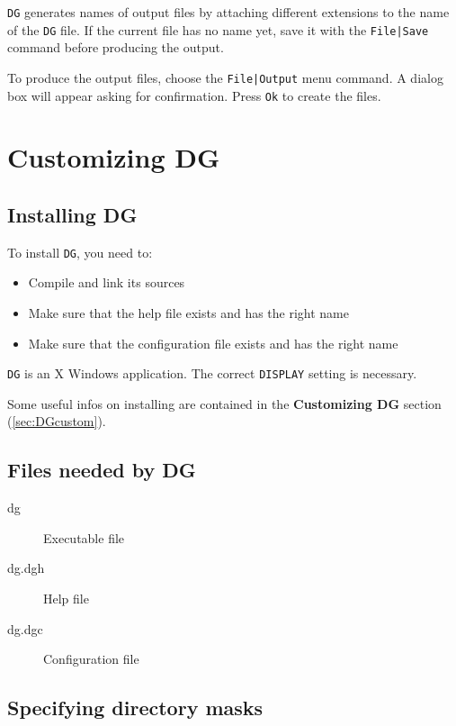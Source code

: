 \documentclass[a4paper,10pt]{report}
\begin{document}
{\tt DG} generates names of output files by attaching different extensions
to the name of the {\tt DG} file. If the current file has no name yet, save
it with the {\tt File|Save} command before producing the output.

To produce the output files, choose the {\tt File|Output} menu
command. A dialog box will appear asking for confirmation. Press
{\tt Ok} to create the files.

\section{Customizing DG}
\label{sec:DGcustom}

\subsection{Installing DG}

To install {\tt DG}, you need to:
\begin{itemize}
\item Compile and link its sources
\item Make sure that the help file exists and has the right name
\item Make sure that the configuration file exists and has the right name
\end{itemize}

{\tt DG} is an X Windows application. The correct {\tt DISPLAY} setting is
necessary.

Some useful infos on installing are contained in the {\bf Customizing DG} section (\ref{sec:DGcustom}).

\subsection{Files needed by DG}

\begin{description}
  \item[dg] Executable file
  \item[dg.dgh] Help file
  \item[dg.dgc] Configuration file
\end{description}

\subsection{Specifying directory masks}
\end{document}
